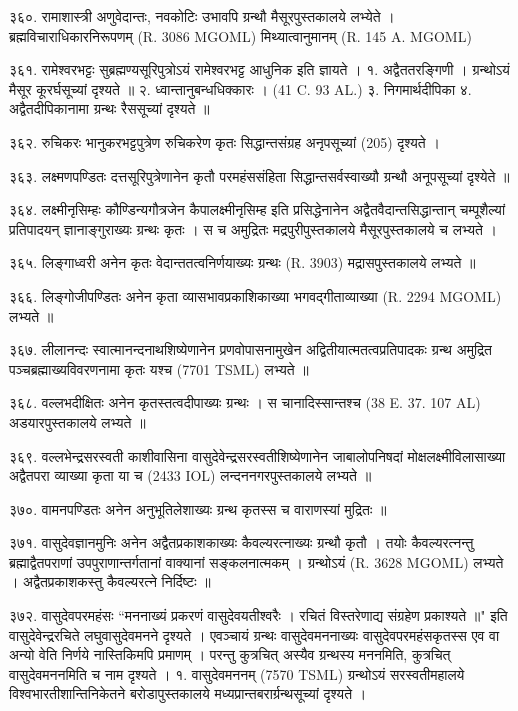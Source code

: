 ३६०. रामाशास्त्री
अणुवेदान्तः, नवकोटिः उभावपि ग्रन्थौ मैसूरपुस्तकालये लभ्येते । ब्रह्मविचाराधिकारनिरूपणम् (R. 3086 MGOML) मिथ्यात्वानुमानम् (R. 145 A. MGOML)

३६१. रामेश्वरभट्टः
सुब्रह्मण्यसूरिपुत्रोऽयं रामेश्वरभट्ट आधुनिक इति ज्ञायते ।
१. अद्वैततरङ्गिणी । ग्रन्थोऽयं मैसूर कूरर्घसूच्यां दृश्यते ॥
२. ध्वान्तानुबन्धधिक्कारः । (41 C. 93 AL.)
३. निगमार्थदीपिका ४. अद्वैतदीपिकानामा ग्रन्थः रैससूच्यां दृश्यते ॥

३६२. रुचिकरः
भानुकरभट्टपुत्रेण रुचिकरेण कृतः सिद्धान्तसंग्रह अनृपसूच्यां (205) दृश्यते ।

३६३. लक्ष्मणपण्डितः
दत्तसूरिपुत्रेणानेन कृतौ परमहंससंहिता सिद्धान्तसर्वस्वाख्यौ ग्रन्थौ अनूपसूच्यां दृश्येते ॥

३६४. लक्ष्मीनृसिम्हः
कौण्डिन्यगौत्रजेन कैपालक्ष्मीनृसिम्ह इति प्रसिद्धेनानेन अद्वैतवैदान्तसिद्धान्तान् चम्पूशैल्यां प्रतिपादयन् ज्ञानाङ्गुराख्यः ग्रन्थः कृतः । स च अमुद्रितः मद्रपुरीपुस्तकालये मैसूरपुस्तकालये च लभ्यते ।

३६५. लिङ्गाध्वरी
अनेन कृतः वेदान्ततत्वनिर्णयाख्यः ग्रन्थः (R. 3903) मद्रासपुस्तकालये लभ्यते ॥

३६६. लिङ्गोजीपण्डितः
अनेन कृता व्यासभावप्रकाशिकाख्या भगवद्गीताव्याख्या (R. 2294 MGOML) लभ्यते ॥

३६७. लीलानन्दः
स्वात्मानन्दनाथशिष्येणानेन प्रणवोपासनामुखेन अद्वितीयात्मतत्वप्रतिपादकः ग्रन्थ अमुद्रित पञ्चब्रह्माख्यविवरणनामा कृतः यश्च (7701 TSML) लभ्यते ॥

३६८. वल्लभदीक्षितः
अनेन कृतस्तत्वदीपाख्यः ग्रन्थः । स चानादिस्सान्तश्च (38 E. 37. 107 AL) अडयारपुस्तकालये लभ्यते ॥

३६९. वल्लभेन्द्रसरस्वती
काशीवासिना वासुदेवेन्द्रसरस्वतीशिष्येणानेन जाबालोपनिषदां मोक्षलक्ष्मीविलासाख्या अद्वैतपरा व्याख्या कृता या च (2433 IOL) लन्दननगरपुस्तकालये लभ्यते ॥

३७०. वामनपण्डितः
अनेन अनुभूतिलेशाख्यः ग्रन्थ कृतस्स च वाराणस्यां मुद्रितः ॥

३७१. वासुदेवज्ञानमुनिः
अनेन अद्वैतप्रकाशकाख्यः कैवल्यरत्नाख्यः ग्रन्थौ कृतौ । तयोः कैवल्यरत्नन्तु ब्रह्माद्वैतपराणां उपपुराणान्तर्गतानां वाक्यानां सङ्कलनात्मकम् । ग्रन्थोऽयं (R. 3628 MGOML) लभ्यते । अद्वैतप्रकाशकस्तु कैवल्यरत्ने निर्दिष्टः ॥

३७२. वासुदेवपरमहंसः
``मननाख्यं प्रकरणं वासुदेवयतीश्वरैः । रचितं विस्तरेणाद्य संग्रहेण प्रकाश्यते ॥" इति वासुदेवेन्द्ररचिते लघुवासुदेवमनने दृश्यते । एवञ्चायं ग्रन्थः वासुदेवमननाख्यः वासुदेवपरमहंसकृतस्स एव वा अन्यो वेति निर्णये नास्तिकिमपि प्रमाणम् । परन्तु कुत्रचित् अस्यैव ग्रन्थस्य मननमिति, कुत्रचित् वासुदेवमननमिति च नाम दृश्यते ।
१. वासुदेवमननम् (7570 TSML) ग्रन्थोऽयं सरस्वतीमहालये विश्वभारतीशान्तिनिकेतने बरोडापुस्तकालये मध्यप्रान्तबरार्ग्रन्थसूच्यां दृश्यते ।

